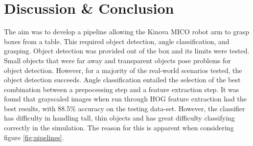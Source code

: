 \documentclass[letterpaper, 10 pt, conference]{conf/ieeeconf}  %
\begin{document}
\section{Discussion \& Conclusion}
\label{sec:discussion}
The aim was to develop a pipeline allowing the Kinova MICO robot arm to grasp
boxes from a table. This required object detection, angle classification, and
grasping. Object detection was provided out of the box and its limits were
tested. Small objects that were far away and transparent objects pose problems
for object detection. However, for a majority of the real-world scenarios
tested, the object detection succeeds. Angle classification entailed the
selection of the best combination between a prepocessing step and a feature
extraction step. It was found that grayscaled images when run through HOG
feature extraction had the best results, with 88.5\% accuracy on the testing
data-set. However, the classifier has difficulty in handling tall, thin objects
and has great difficulty classifying correctly in the simulation. The reason for
this is apparent when considering figure \ref{fig:pipelines}.
\end{document}
